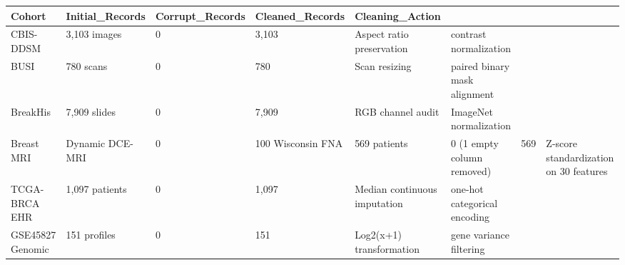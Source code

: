\begin{tabular}{lllll}
\toprule
Cohort & Initial_Records & Corrupt_Records & Cleaned_Records & Cleaning_Action \\
\midrule
CBIS-DDSM & 3,103 images & 0 & 3,103 & Aspect ratio preservation & contrast normalization \\
BUSI & 780 scans & 0 & 780 & Scan resizing & paired binary mask alignment \\
BreakHis & 7,909 slides & 0 & 7,909 & RGB channel audit & ImageNet normalization \\
Breast MRI & Dynamic DCE-MRI & 0 & 100%
Wisconsin FNA & 569 patients & 0 (1 empty column removed) & 569 & Z-score standardization on 30 features \\
TCGA-BRCA EHR & 1,097 patients & 0 & 1,097 & Median continuous imputation & one-hot categorical encoding \\
GSE45827 Genomic & 151 profiles & 0 & 151 & Log2(x+1) transformation & gene variance filtering \\
\bottomrule
\end{tabular}
